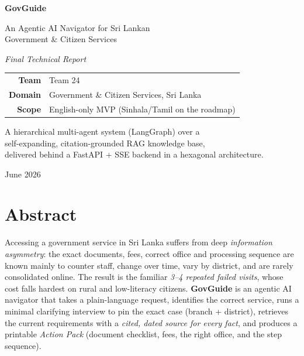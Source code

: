 \documentclass[11pt,a4paper]{article}
\begin{document}
\begin{titlepage}
  \centering
  \vspace*{1.6cm}
  {\Huge\bfseries GovGuide\par}
  \vspace{0.5cm}
  {\Large An Agentic AI Navigator for Sri Lankan\\[2pt] Government \& Citizen Services\par}
  \vspace{1.0cm}
  {\large\itshape Final Technical Report\par}
  \vspace{2.0cm}

  \begin{tabular}{rl}
    \textbf{Team}     & Team 24 \\[3pt]
    \textbf{Domain}   & Government \& Citizen Services, Sri Lanka \\[3pt]
    \textbf{Scope}    & English-only MVP (Sinhala/Tamil on the roadmap) \\
  \end{tabular}

  \vfill
  {\large A hierarchical multi-agent system (LangGraph) over a\\
   self-expanding, citation-grounded RAG knowledge base,\\
   delivered behind a FastAPI + SSE backend in a hexagonal architecture.\par}
  \vspace{1.2cm}
  {\small June 2026\par}
\end{titlepage}

\thispagestyle{fancy}
\section*{Abstract}
Accessing a government service in Sri Lanka suffers from deep \emph{information asymmetry}:
the exact documents, fees, correct office and processing sequence are known mainly to counter
staff, change over time, vary by district, and are rarely consolidated online. The result is the
familiar \emph{3--4 repeated failed visits}, whose cost falls hardest on rural and low-literacy
citizens. \textbf{GovGuide} is an agentic AI navigator that takes a plain-language request,
identifies the correct service, runs a minimal clarifying interview to pin the exact case
(branch + district), retrieves the current requirements with a \emph{cited, dated source for every
fact}, and produces a printable \emph{Action Pack} (document checklist, fees, the right office, and
the step sequence).
\end{document}
